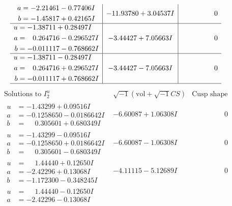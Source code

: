 \documentclass[1p]{elsarticle_modified}
\theoremstyle{definition}
\newcommand{\I}{\sqrt{-1}}
\begin{document}
$$\begin{array}{c|c|c}
\begin{aligned}
a &= -2.21461 - 0.77406 I \\
b &= -1.45817 + 0.42165 I\end{aligned}
 & -11.93780 + 3.04537 I & \phantom{-0.000000 } 0 \\ \hline\begin{aligned}
u &= -1.38711 + 0.28497 I \\
a &= \phantom{-}0.264716 - 0.296527 I \\
b &= -0.011117 - 0.768662 I\end{aligned}
 & -3.44427 + 7.05663 I & \phantom{-0.000000 } 0 \\ \hline\begin{aligned}
u &= -1.38711 - 0.28497 I \\
a &= \phantom{-}0.264716 + 0.296527 I \\
b &= -0.011117 + 0.768662 I\end{aligned}
 & -3.44427 - 7.05663 I & \phantom{-0.000000 } 0\\
 \hline 
 \end{array}$$\newpage$$\begin{array}{c|c|c}  
\text{Solutions to }I^u_{2}& \I (\text{vol} + \sqrt{-1}CS) & \text{Cusp shape}\\
 \hline 
\begin{aligned}
u &= -1.43299 + 0.09516 I \\
a &= -0.1258650 - 0.0186642 I \\
b &= \phantom{-}0.305601 + 0.680349 I\end{aligned}
 & -6.60087 + 1.06308 I & \phantom{-0.000000 } 0 \\ \hline\begin{aligned}
u &= -1.43299 - 0.09516 I \\
a &= -0.1258650 + 0.0186642 I \\
b &= \phantom{-}0.305601 - 0.680349 I\end{aligned}
 & -6.60087 - 1.06308 I & \phantom{-0.000000 } 0 \\ \hline\begin{aligned}
u &= \phantom{-}1.44440 + 0.12650 I \\
a &= -2.42296 + 0.13068 I \\
b &= -1.172300 - 0.348245 I\end{aligned}
 & -4.11115 - 5.12689 I & \phantom{-0.000000 } 0 \\ \hline\begin{aligned}
u &= \phantom{-}1.44440 - 0.12650 I \\
a &= -2.42296 - 0.13068 I \\

\end{aligned}
\end{array}$$
\end{document}
